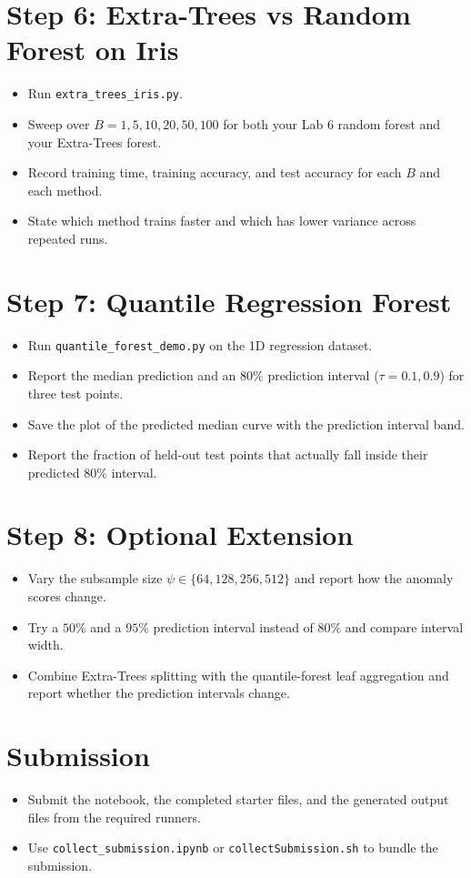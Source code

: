 \section*{Step 6: Extra-Trees vs Random Forest on Iris}
\begin{itemize}
  \item Run \texttt{extra\_trees\_iris.py}.
  \item Sweep over $B = 1, 5, 10, 20, 50, 100$ for both your Lab 6 random forest and your Extra-Trees forest.
  \item Record training time, training accuracy, and test accuracy for each $B$ and each method.
  \item State which method trains faster and which has lower variance across repeated runs.
\end{itemize}

\section*{Step 7: Quantile Regression Forest}
\begin{itemize}
  \item Run \texttt{quantile\_forest\_demo.py} on the 1D regression dataset.
  \item Report the median prediction and an $80\%$ prediction interval ($\tau=0.1,0.9$) for three test points.
  \item Save the plot of the predicted median curve with the prediction interval band.
  \item Report the fraction of held-out test points that actually fall inside their predicted $80\%$ interval.
\end{itemize}

\section*{Step 8: Optional Extension}
\begin{itemize}
  \item Vary the subsample size $\psi \in \{64, 128, 256, 512\}$ and report how the anomaly scores change.
  \item Try a $50\%$ and a $95\%$ prediction interval instead of $80\%$ and compare interval width.
  \item Combine Extra-Trees splitting with the quantile-forest leaf aggregation and report whether the prediction intervals change.
\end{itemize}

\section*{Submission}
\begin{itemize}
  \item Submit the notebook, the completed starter files, and the generated output files from the required runners.
  \item Use \texttt{collect\_submission.ipynb} or \texttt{collectSubmission.sh} to bundle the submission.
\end{itemize}
